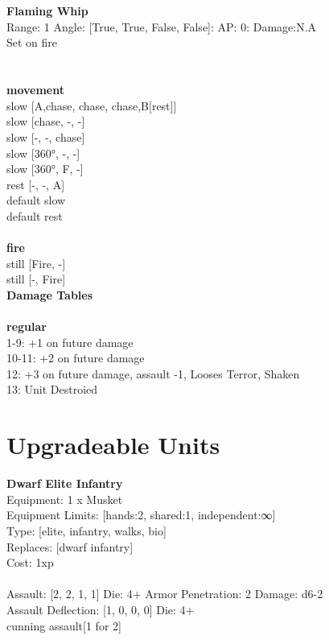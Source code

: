 \ \\

\ \\
{\bf Flaming Whip } \\



Range: 1  Angle: [True, True, False, False]: AP: 0: Damage:N.A \\
Set on fire\\ 




 
\ \\




\ \\ {\bf movement } \\
slow [A,chase, chase, chase,B[rest]] \\
slow [chase, -, -] \\
slow [-, -, chase] \\
slow [360°, -, -] \\
slow [360°, F, -] \\
rest [-, -, A] \\
default slow \\
default rest \\
\ \\ {\bf fire } \\
still [Fire, -] \\
still [-, Fire] \\


{\bf Damage Tables} \\
\ \\ {\bf regular } \\
1-9: +1 on future damage \\
10-11: +2 on future damage \\
12: +3 on future damage, assault -1, Looses Terror, Shaken \\
13: Unit Destroied \\










\pagebreak\section{Upgradeable Units}{\bf Dwarf Elite Infantry } \\
Equipment: 1 x Musket \\
Equipment Limits: [hands:2, shared:1, independent:∞] \\
Type: [elite, infantry, walks, bio] \\
Replaces: [dwarf infantry] \\
Cost: 1xp\\
\ \\
Assault: [2, 2, 1, 1] Die: 4+ Armor Penetration: 2 Damage: d6-2 \\
Assault Deflection: [1, 0, 0, 0] Die: 4+\\
\indent cunning assault[1 for 2]\\ 
 
